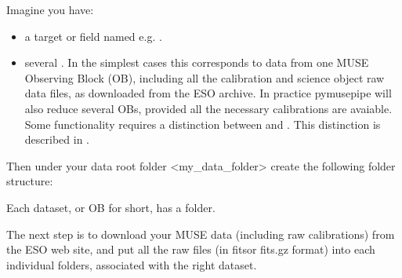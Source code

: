 \documentclass[letterpaper,10pt,english]{sphinxmanual}
\begin{document}
\sphinxAtStartPar
Imagine you have:
\begin{itemize}
\item {} 
\sphinxAtStartPar
a target or field named e.g. .

\item {} 
\sphinxAtStartPar
several . In the simplest cases this corresponds to data from one
MUSE Observing Block (OB), including all the calibration and science object raw data files, as
downloaded from the ESO archive. In practice pymusepipe will also reduce several OBs, provided
all the necessary calibrations are avaiable. Some functionality requires a distinction between
 and . This distinction is described in {\hyperref[\detokenize{mosaicking::doc}]{}}.

\end{itemize}

\sphinxAtStartPar
Then under your data root folder \textless{}my\_data\_folder\textgreater{} create the following folder structure:

\begin{sphinxVerbatim}[commandchars=\\\{\}]
\end{sphinxVerbatim}

\sphinxAtStartPar
Each dataset, or OB for short, has a  folder.

\sphinxAtStartPar
The next step is to download your MUSE data (including raw calibrations) from the
ESO web site, and put all the raw files (in fitsor fits.gz format) into each individual
 folders, associated with the right dataset.
\end{document}
